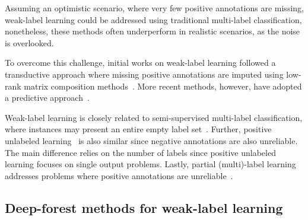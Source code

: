 \documentclass[conference,compsoc]{IEEEtran}
\begin{document}
Assuming an optimistic scenario, where very few positive annotations are missing, weak-label learning could be addressed using traditional multi-label classification, nonetheless, these methods often underperform in realistic scenarios, as the noise is overlooked. 

To overcome this challenge, initial works on weak-label learning followed a transductive approach where missing positive annotations are imputed using low-rank matrix composition methods~\cite{sun2010multi, xu2013speedup}. More recent methods, however, have adopted a predictive approach~\cite{wang2020dual}.

Weak-label learning is closely related to semi-supervised multi-label classification, where instances may present an entire empty label set~\cite{zhan2017inductive}. Further, positive unlabeled learning~\cite{bekker2020learning} is also similar since negative annotations are also unreliable. The main difference relies on the number of labels since positive unlabeled learning focuses on single output problems. Lastly, partial (multi)-label learning addresses problems where positive annotations are unreliable~\cite{xie2018partial}. 

\subsection{Deep-forest methods for weak-label learning}



\end{document}

